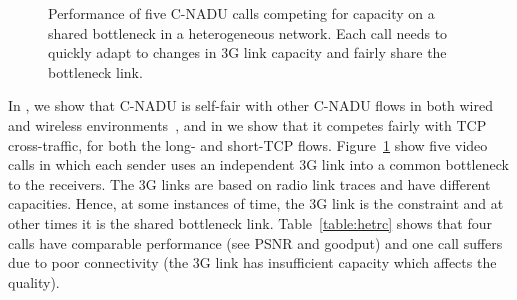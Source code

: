\begin{figure}[!t]
\centerline{
{}
{}
}
\centerline{
{}
{}
}
\caption{Performance of five C-NADU calls competing for
capacity on a shared bottleneck in a heterogeneous network. Each call needs
to quickly adapt to changes in 3G link capacity and fairly share the
bottleneck link.}
\label{fig:hetrc}
\end{figure}

\begin{table}[!t]
\caption{C-NADU: Five calls in a heterogeneous network with end-to-end latency
between 60-120\,\emph{ms} and 0.5\% link-layer losses.}
\label{table:hetrc}
\end{table}

In , we show that C-NADU is self-fair with other C-NADU flows
in both wired and wireless environments~\cite{singh:2010.thesis}, and in
 we show that it competes fairly with TCP cross-traffic, for both
the long- and short-TCP flows. Figure~\ref{fig:hetrc} show five video calls in which
each sender uses an independent 3G link into a common bottleneck to the
receivers. The 3G links are based on radio link traces and have different
capacities. Hence, at some instances of time, the 3G link is the constraint and
at other times it is the shared bottleneck link. Table~\ref{table:hetrc} shows that
four calls have comparable performance (see PSNR and goodput) and one call suffers
due to poor connectivity (the 3G link has insufficient capacity which affects
the quality).

